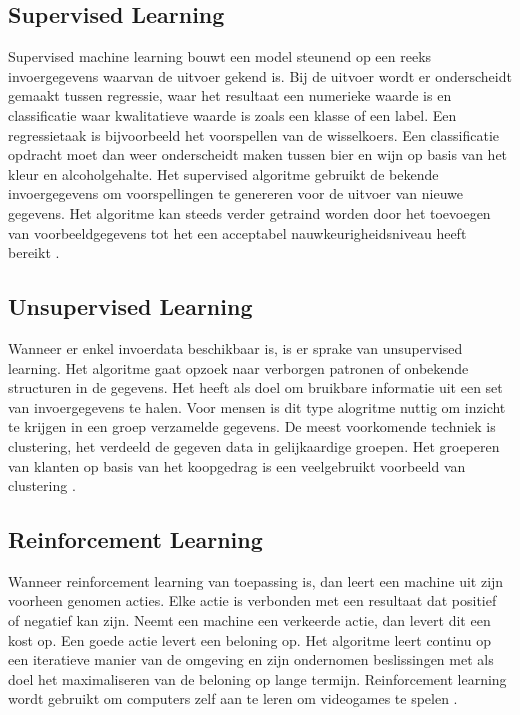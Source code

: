 \subsection{Supervised Learning}
\label{ssec:Supervised Learning}
Supervised machine learning bouwt een model steunend op een reeks invoergegevens waarvan de uitvoer gekend is. Bij de uitvoer wordt er onderscheidt gemaakt tussen regressie, waar het resultaat een numerieke waarde is en classificatie waar kwalitatieve waarde is zoals een klasse of een label. Een regressietaak is bijvoorbeeld het voorspellen van de wisselkoers. Een classificatie opdracht moet dan weer onderscheidt maken tussen bier en wijn op basis van het kleur en alcoholgehalte. Het supervised algoritme gebruikt de bekende invoergegevens om voorspellingen te genereren voor de uitvoer van nieuwe gegevens. Het algoritme kan steeds verder getraind worden door het toevoegen van voorbeeldgegevens tot het een acceptabel nauwkeurigheidsniveau heeft bereikt \autocite{Dummies}.

\subsection{Unsupervised Learning}
\label{ssec:Unsupervised Learning}
Wanneer er enkel invoerdata beschikbaar is, is er sprake van unsupervised learning. Het algoritme gaat opzoek naar verborgen patronen of onbekende structuren in de gegevens. Het heeft als doel om bruikbare informatie uit een set van invoergegevens te halen. Voor mensen is dit type alogritme nuttig om inzicht te krijgen in een groep verzamelde gegevens. De meest voorkomende techniek is clustering, het verdeeld de gegeven data in gelijkaardige groepen. Het groeperen van klanten op basis van het koopgedrag is een veelgebruikt voorbeeld van clustering \autocite{Mathworks}.

\subsection{Reinforcement Learning}
\label{ssec:Reinforcement Learning}
Wanneer reinforcement learning van toepassing is, dan leert een machine uit zijn voorheen genomen acties. Elke actie is verbonden met een resultaat dat positief of negatief kan zijn. Neemt een machine een verkeerde actie, dan levert dit een kost op. Een goede actie levert een beloning op. Het algoritme leert continu op een iteratieve manier van de omgeving en zijn ondernomen beslissingen met als doel het maximaliseren van de beloning op lange termijn. Reinforcement learning wordt gebruikt om computers zelf aan te leren om videogames te spelen \autocite{incompleteideas}.


